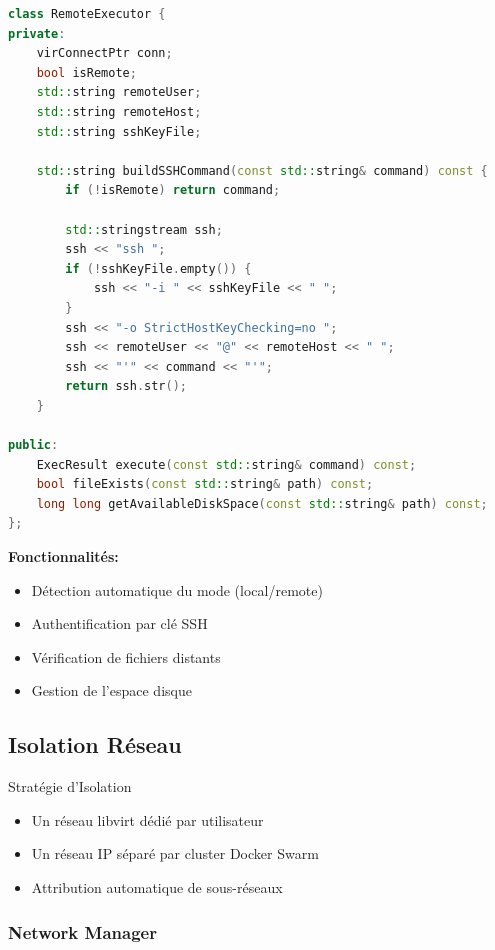 \documentclass[12pt,a4paper]{article}
\begin{document}
\begin{lstlisting}[language=C++, caption=Exécution de commandes à distance]
class RemoteExecutor {
private:
    virConnectPtr conn;
    bool isRemote;
    std::string remoteUser;
    std::string remoteHost;
    std::string sshKeyFile;
    
    std::string buildSSHCommand(const std::string& command) const {
        if (!isRemote) return command;
        
        std::stringstream ssh;
        ssh << "ssh ";
        if (!sshKeyFile.empty()) {
            ssh << "-i " << sshKeyFile << " ";
        }
        ssh << "-o StrictHostKeyChecking=no ";
        ssh << remoteUser << "@" << remoteHost << " ";
        ssh << "'" << command << "'";
        return ssh.str();
    }
    
public:
    ExecResult execute(const std::string& command) const;
    bool fileExists(const std::string& path) const;
    long long getAvailableDiskSpace(const std::string& path) const;
};
\end{lstlisting}

\textbf{Fonctionnalités:}
\begin{itemize}
    \item Détection automatique du mode (local/remote)
    \item Authentification par clé SSH
    \item Vérification de fichiers distants
    \item Gestion de l'espace disque
\end{itemize}

\subsection{Isolation Réseau}

\begin{successbox}{Stratégie d'Isolation}
\begin{itemize}
    \item Un réseau libvirt dédié par utilisateur
    \item Un réseau IP séparé par cluster Docker Swarm
    \item Attribution automatique de sous-réseaux
\end{itemize}
\end{successbox}

\subsubsection{Network Manager}
\end{document}
